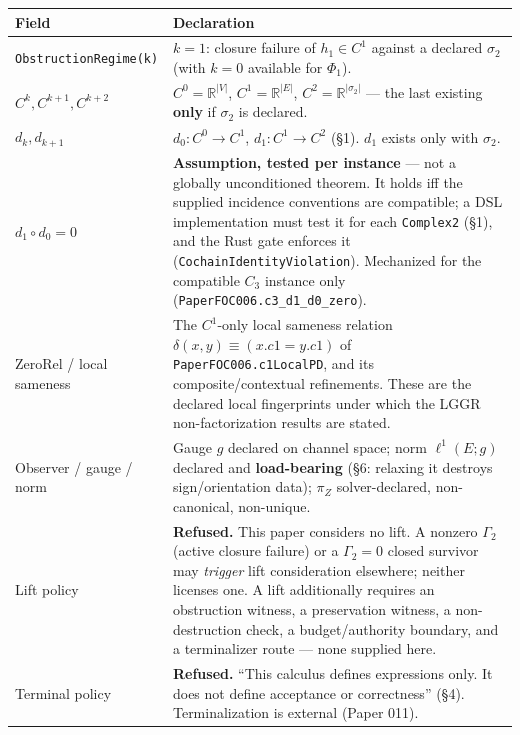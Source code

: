\documentclass[
]{article}
\begin{document}
\begin{longtable}[]{@{}
  >{\raggedright\arraybackslash}p{}
  >{\raggedright\arraybackslash}p{}@{}}
\toprule\noalign{}
\begin{minipage}[b]{\linewidth}\raggedright
Field
\end{minipage} & \begin{minipage}[b]{\linewidth}\raggedright
Declaration
\end{minipage} \\
\midrule\noalign{}
\endhead
\bottomrule\noalign{}
\endlastfoot
\texttt{ObstructionRegime(k)} & \(k=1\): closure failure of \(h_1\in C^1\) against a declared \(\sigma_2\) (with \(k=0\) available for \(\Phi_1\)). \\
\(C^k, C^{k+1}, C^{k+2}\) & \(C^0=\mathbb{R}^{\lvert V\rvert}\), \(C^1=\mathbb{R}^{\lvert E\rvert}\), \(C^2=\mathbb{R}^{\lvert\sigma_2\rvert}\) --- the last existing \textbf{only} if \(\sigma_2\) is declared. \\
\(d_k, d_{k+1}\) & \(d_0:C^0\to C^1\), \(d_1:C^1\to C^2\) (§1). \(d_1\) exists only with \(\sigma_2\). \\
\(d_1\circ d_0=0\) & \textbf{Assumption, tested per instance} --- not a globally unconditioned theorem. It holds iff the supplied incidence conventions are compatible; a DSL implementation must test it for each \texttt{Complex2} (§1), and the Rust gate enforces it (\texttt{CochainIdentityViolation}). Mechanized for the compatible \(C_3\) instance only (\texttt{PaperFOC006.c3\_d1\_d0\_zero}). \\
ZeroRel / local sameness & The \(C^1\)-only local sameness relation \(\delta(x,y) \equiv (x.c1 = y.c1)\) of \texttt{PaperFOC006.c1LocalPD}, and its composite/contextual refinements. These are the declared local fingerprints under which the LGGR non-factorization results are stated. \\
Observer / gauge / norm & Gauge \(g\) declared on channel space; norm \(\ell^1(E;g)\) declared and \textbf{load-bearing} (§6: relaxing it destroys sign/orientation data); \(\pi_Z\) solver-declared, non-canonical, non-unique. \\
Lift policy & \textbf{Refused.} This paper considers no lift. A nonzero \(\Gamma_2\) (active closure failure) or a \(\Gamma_2=0\) closed survivor may \emph{trigger} lift consideration elsewhere; neither licenses one. A lift additionally requires an obstruction witness, a preservation witness, a non-destruction check, a budget/authority boundary, and a terminalizer route --- none supplied here. \\
Terminal policy & \textbf{Refused.} ``This calculus defines expressions only. It does not define acceptance or correctness'' (§4). Terminalization is external (Paper 011). \\
\end{longtable}
\end{document}
